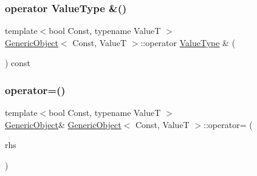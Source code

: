 \mbox{\label{classGenericObject_a2948af90e01df17989cd844d6197eb18}} 
\subsubsection{\texorpdfstring{operator Value\+Type \&()}{operator ValueType \&()}}
{\footnotesize\ttfamily template$<$bool Const, typename ValueT $>$ \\
\hyperlink{classGenericObject}{Generic\+Object}$<$ Const, ValueT $>$\+::operator \hyperlink{classGenericObject_a930aa30f89caee7ba7bff60bf9dc21b1}{Value\+Type} \& (\begin{DoxyParamCaption}{ }\end{DoxyParamCaption}) const\hspace{0.3cm}{\ttfamily [inline]}}

\mbox{\label{classGenericObject_af8984f76d6f3b13039c6d3b8e217f747}} 
\subsubsection{\texorpdfstring{operator=()}{operator=()}}
{\footnotesize\ttfamily template$<$bool Const, typename ValueT $>$ \\
\hyperlink{classGenericObject}{Generic\+Object}\& \hyperlink{classGenericObject}{Generic\+Object}$<$ Const, ValueT $>$\+::operator= (\begin{DoxyParamCaption}\item[{\hyperlink{classGenericObject_af70c9646b5e422306c33e98b3d8783a7}{const} \hyperlink{classGenericObject}{Generic\+Object}$<$ Const, ValueT $>$ \&}]{rhs }\end{DoxyParamCaption})\hspace{0.3cm}{\ttfamily [inline]}}

\mbox{\label{classGenericObject_a2d8c758d10e7c7ab23e3904d5936b204}} 
